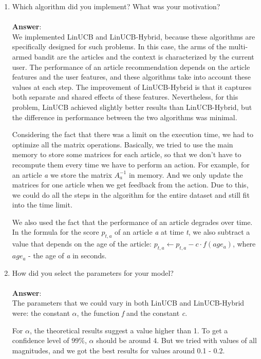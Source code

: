 \documentclass[11pt]{article}
\begin{document}
\begin{enumerate}
\item Which algorithm did you implement? What was your motivation? \\ \\
\textbf{Answer}: \\ 
We implemented LinUCB and LinUCB-Hybrid, because these algorithms are specifically 
designed for such problems. In this case, the arms of the multi-armed bandit are 
the articles and the context is characterized by the current user. 
The performance of an article recommendation depends on the article features 
and the user features, and these algorithms take into account these values at each step. 
The improvement of LinUCB-Hybrid is that it captures both separate and shared effects 
of these features. 
Nevertheless, for this problem, LinUCB achieved slightly better results than 
LinUCB-Hybrid, but the difference in performance between the two algorithms was minimal.


Considering the fact that there was a limit on the execution time, we had to 
optimize all the matrix operations. Basically, we tried to use the main memory to store
some matrices for each article, so that we don't have to recompute them every time we
have to perform an action. For example, for an article \emph{a} we store the matrix
$A_a ^ {-1}$ in memory. And we only update the matrices for one article when we get 
feedback from the action. Due to this, we could do all the steps in the algorithm for
the entire dataset and still fit into the time limit. 

We also used the fact that the performance of an article degrades over time. 
In the formula for the score $p_{t,a}$ of an article \emph{a} at time \emph{t}, we also
subtract a value that depends on the age of the article: 
$p_{t,a} \gets p_{t,a} - c \cdot f(age_a)$, 
where $age_a$ - the age of \emph{a} in seconds.

\item How did you select the parameters for your model? \\ \\

\textbf{Answer}: \\
The parameters that we could vary in both LinUCB and LinUCB-Hybrid were: 
the constant $\alpha$, the function \emph{f} and the constant \emph{c}.

For $\alpha$, the theoretical results suggest a value higher than 1. To get a confidence
level of $99\%$, $\alpha$ should be around 4. 
But we tried with values of all magnitudes, and we got the best results for values around
0.1 - 0.2.


\end{enumerate}
\end{document}

